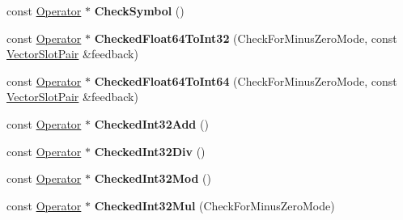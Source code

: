 \begin{DoxyCompactItemize}
const \mbox{\hyperlink{classv8_1_1internal_1_1compiler_1_1Operator}{Operator}} $\ast$ {\bfseries Check\+Symbol} ()
\item 
\mbox{\label{classv8_1_1internal_1_1compiler_1_1SimplifiedOperatorBuilder_a8c0fca90b32efa52a2ca89481e7b0e75}} 
const \mbox{\hyperlink{classv8_1_1internal_1_1compiler_1_1Operator}{Operator}} $\ast$ {\bfseries Checked\+Float64\+To\+Int32} (Check\+For\+Minus\+Zero\+Mode, const \mbox{\hyperlink{classv8_1_1internal_1_1VectorSlotPair}{Vector\+Slot\+Pair}} \&feedback)
\item 
\mbox{\label{classv8_1_1internal_1_1compiler_1_1SimplifiedOperatorBuilder_a80eaa9b918078b2d66d2cb335e6d4ca9}} 
const \mbox{\hyperlink{classv8_1_1internal_1_1compiler_1_1Operator}{Operator}} $\ast$ {\bfseries Checked\+Float64\+To\+Int64} (Check\+For\+Minus\+Zero\+Mode, const \mbox{\hyperlink{classv8_1_1internal_1_1VectorSlotPair}{Vector\+Slot\+Pair}} \&feedback)
\item 
\mbox{\label{classv8_1_1internal_1_1compiler_1_1SimplifiedOperatorBuilder_a816e6922af21f159ada17f277ddfa0aa}} 
const \mbox{\hyperlink{classv8_1_1internal_1_1compiler_1_1Operator}{Operator}} $\ast$ {\bfseries Checked\+Int32\+Add} ()
\item 
\mbox{\label{classv8_1_1internal_1_1compiler_1_1SimplifiedOperatorBuilder_aa9999b631c2cc9b488ad0e61c82a8fa7}} 
const \mbox{\hyperlink{classv8_1_1internal_1_1compiler_1_1Operator}{Operator}} $\ast$ {\bfseries Checked\+Int32\+Div} ()
\item 
\mbox{\label{classv8_1_1internal_1_1compiler_1_1SimplifiedOperatorBuilder_a8fccafb73ee6902284b756ed6764b15f}} 
const \mbox{\hyperlink{classv8_1_1internal_1_1compiler_1_1Operator}{Operator}} $\ast$ {\bfseries Checked\+Int32\+Mod} ()
\item 
\mbox{\label{classv8_1_1internal_1_1compiler_1_1SimplifiedOperatorBuilder_a0f356d4b7bd588f877a4f6723a20eeea}} 
const \mbox{\hyperlink{classv8_1_1internal_1_1compiler_1_1Operator}{Operator}} $\ast$ {\bfseries Checked\+Int32\+Mul} (Check\+For\+Minus\+Zero\+Mode)

\end{DoxyCompactItemize}
